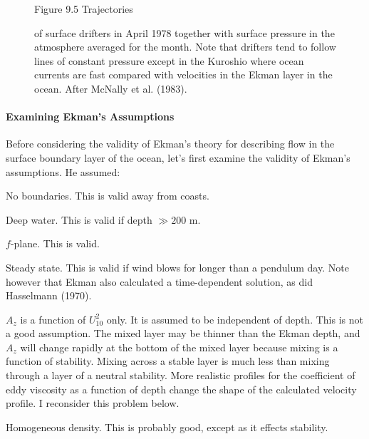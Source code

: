 \begin{figure}[t!]
\footnotesize
Figure 9.5 Trajectories \rule{0mm}{3ex}of surface
drifters in April 1978 together with
surface pressure in the atmosphere averaged for the month. Note that
drifters tend to follow lines of constant pressure except in the
Kuroshio where ocean currents are
fast compared with velocities in the Ekman layer in the ocean. After
McNally et al. (1983).
\label{drifterplot}
\vspace{-3ex}
\end{figure}

\paragraph{Examining Ekman's Assumptions}
Before considering the
validity of Ekman's theory for describing flow in the surface boundary
layer of the ocean, let's first examine the validity of Ekman's
assumptions. He assumed:
\begin{enumerate}
\vitem No boundaries. This is valid away from coasts.

\vitem Deep water. This is valid if depth $\gg 200$ m.

\vitem $f$-plane. This is valid.

\vitem Steady state. This is valid if wind blows for longer than a
pendulum day.  Note however that Ekman also calculated a
time-dependent solution, as did Hasselmann (1970).

\vitem $A_z$ is a function of $U^2_{10}$ only. It is assumed to be
independent of depth. This is not a good assumption. The mixed
layer may be thinner than the Ekman
depth, and $A_z$ will change rapidly at the bottom of the mixed
layer because mixing is a function
of stability. Mixing across a stable layer is much less than mixing
through a layer of a neutral stability. More realistic profiles for
the coefficient of eddy viscosity as a function of depth change the
shape of the calculated velocity profile. I reconsider this problem
below.

\vitem Homogeneous density. This is probably good, except as it
effects stability.
\end{enumerate}

